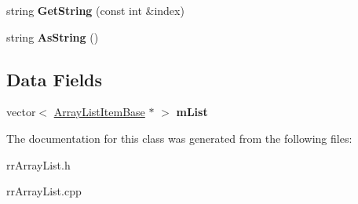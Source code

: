 \begin{DoxyCompactItemize}
\item 
\hypertarget{classrrc_1_1_array_list_a5d5c7bbe7e47d8a8f91911a7bcd4636d}{string {\bfseries Get\-String} (const int \&index)}\label{classrrc_1_1_array_list_a5d5c7bbe7e47d8a8f91911a7bcd4636d}

\item 
\hypertarget{classrrc_1_1_array_list_afb0cb51aaa92f311621daed306530e97}{string {\bfseries As\-String} ()}\label{classrrc_1_1_array_list_afb0cb51aaa92f311621daed306530e97}

\end{DoxyCompactItemize}
\subsection*{Data Fields}
\begin{DoxyCompactItemize}
\item 
\hypertarget{classrrc_1_1_array_list_a7825d7740ce9e23ba3f867189698155e}{vector$<$ \hyperlink{classrrc_1_1_array_list_item_base}{Array\-List\-Item\-Base} $\ast$ $>$ {\bfseries m\-List}}\label{classrrc_1_1_array_list_a7825d7740ce9e23ba3f867189698155e}

\end{DoxyCompactItemize}


The documentation for this class was generated from the following files\-:\begin{DoxyCompactItemize}
\item 
rr\-Array\-List.\-h\item 
rr\-Array\-List.\-cpp\end{DoxyCompactItemize}
